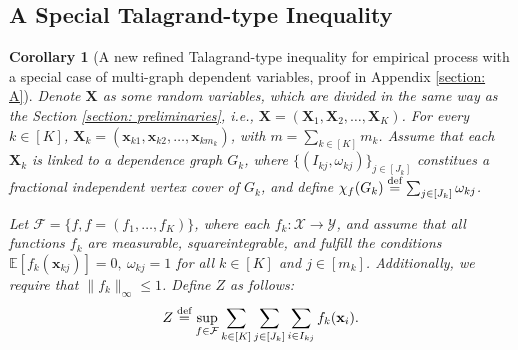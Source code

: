 \documentclass{article}
\def\sR{\mathbb{R}}
\def\vx{{\mathbf{x}}}
\def\mX{{\mathbf{X}}}
\def\eE{\mathbb{E}}
\def\defeq{\overset{\textup{def}}{=}}
\newtheorem{corollary}{Corollary}
\begin{document}
\subsection{A Special Talagrand-type Inequality}
\label{sec-app:special_talagrand_inequality}
\begin{corollary} [A new refined Talagrand-type inequality for empirical process with a special case of  multi-graph dependent variables, proof in Appendix \ref{section: A}]
\label{thm:talagrand_inequality_refined}
    Denote $\mX$ as some random variables, which are divided in the same way as the Section \ref{section: preliminaries}, i.e., $\mX = (\mX_1,\mX_2,\dots,\mX_K)$. For every $k \in [K]$, $\mX_k = (\vx_{k1},\vx_{k2},\dots,\vx_{k m_k})$, with $m=\sum_{k \in [K]}m_k$. Assume that each $\mX_k$ is linked to a dependence graph $G_k$, where $\{ (I_{kj}, \omega_{kj}) \}_{j \in [J_k]}$ constitues a fractional independent vertex cover of $G_k$, and define $\chi_{f} (G_k) \defeq \sum_{j \in [J_k]} \omega_{kj}$.
    


Let $\mathcal{F} = \{ f, f = (f_1,\dots,f_K) \}$, where each $f_k: \mathcal{X} \rightarrow \mathcal{Y}$, and assume that all functions $f_k$ are measurable, squareintegrable, and fulfill the conditions $\eE [f_k(\vx_{kj})] = 0, ~\omega_{kj}=1$ for all $k \in [K]$ and $j \in [m_k]$. Additionally, we require that $\|f_k\|_{\infty} \leq 1$.
Define $Z$ as follows:
    \begin{align*}
        Z \defeq \sup_{f \in \mathcal{F}} \sum_{k \in [K]} \sum_{j \in [J_k]}  \sum_{i \in I_{kj}} f_k(\vx_i).
    \end{align*}


\end{corollary}
\end{document}
